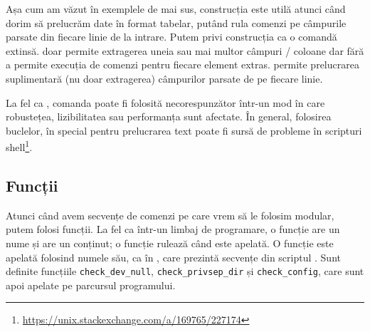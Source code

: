 Așa cum am văzut în exemplele de mai sus, construcția  este utilă atunci când dorim să prelucrăm date în format tabelar, putând rula comenzi pe câmpurile parsate din fiecare linie de la intrare.
Putem privi construcția  ca o comandă  extinsă.
 doar permite extragerea uneia sau mai multor câmpuri / coloane dar fără a permite execuția de comenzi pentru fiecare element extras.
 permite prelucrarea suplimentară (nu doar extragerea) câmpurilor parsate de pe fiecare linie.

La fel ca , comanda  poate fi folosită necorespunzător într-un mod în care robustețea, lizibilitatea sau performanța sunt afectate.
În general, folosirea buclelor, în special pentru prelucrarea text poate fi sursă de probleme în scripturi shell\footnote{\url{https://unix.stackexchange.com/a/169765/227174}}.

\subsection{Funcții}
\label{sec:auto:script-func:func}

Atunci când avem secvențe de comenzi pe care vrem să le folosim modular, putem folosi funcții.
La fel ca într-un limbaj de programare, o funcție are un nume și are un conținut; o funcție rulează când este apelată.
O funcție este apelată folosind numele său, ca în , care prezintă secvențe din scriptul .
Sunt definite funcțiile \texttt{check\_dev\_null}, \texttt{check\_privsep\_dir} și \texttt{check\_config}, care sunt apoi apelate pe parcursul programului.


